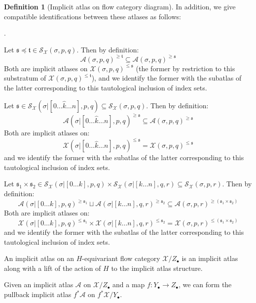 \documentclass[12pt]{article}
\theoremstyle{definition}
\newtheorem{definition}[theorem]{Definition}
\theoremstyle{remark}
\numberwithin{equation}{subsection}
\newcommand{\s}{\mathfrak s}
\newcommand{\ttt}{\mathfrak t}
\newcommand{\X}{\mathcal X}
\newcommand{\SSS}{\mathcal S}
\newcommand{\A}{\mathcal A}
\newcounter{rcounti}
\newenvironment{rlist}{\begin{list}{\roman{rcounti}.}{\usecounter{rcounti}
\setlength\itemsep{0pt}
\setlength\labelsep{4pt}
\setlength\labelwidth{16pt}
\setlength\leftmargin{32pt}
\setlength\listparindent{0pt}
\setlength\parsep{0pt}
\setlength\parskip{0pt}
\setlength\partopsep{0pt}
\setlength\rightmargin{0pt}
\setlength\topsep{0pt}
\setlength\itemindent{0pt}
}}{\end{list}}
\begin{document}
\begin{definition}[Implicit atlas on flow category diagram]
In addition, we give compatible identifications between these atlases as follows:
\begin{rlist}
\item\label{substratumC}Let $\s\preceq\ttt\in\SSS_\X(\sigma,p,q)$.  Then by definition:
\begin{equation*}%
\A(\sigma,p,q)^{\geq\ttt}\subseteq\A(\sigma,p,q)^{\geq\s}
\end{equation*}
Both are implicit atlases on $\X(\sigma,p,q)^{\leq\s}$ (the former by restriction to this substratum of $\X(\sigma,p,q)^{\leq\ttt}$), and we identify the former with the subatlas of the latter corresponding to this tautological inclusion of index sets.
\item\label{faceC}Let $\s\in\SSS_\X(\sigma|[0\ldots\hat k\ldots n],p,q)\subseteq\SSS_\X(\sigma,p,q)$.  Then by definition:
\begin{equation*}%
\A(\sigma|[0\ldots\hat k\ldots n],p,q)^{\geq\s}\subseteq\A(\sigma,p,q)^{\geq\s}
\end{equation*}
Both are implicit atlases on:
\begin{equation*}%
\X(\sigma|[0\ldots\hat k\ldots n],p,q)^{\leq\s}=\X(\sigma,p,q)^{\leq\s}
\end{equation*}
and we identify the former with the subatlas of the latter corresponding to this tautological inclusion of index sets.
\item\label{productC}Let $\s_1\times\s_2\in\SSS_\X(\sigma|[0\ldots k],p,q)\times\SSS_\X(\sigma|[k\ldots n],q,r)\subseteq\SSS_\X(\sigma,p,r)$.  Then by definition:
\begin{equation*}%
\A(\sigma|[0\ldots k],p,q)^{\geq\s_1}\sqcup\A(\sigma|[k\ldots n],q,r)^{\geq\s_2}\subseteq\A(\sigma,p,r)^{\geq(\s_1\times\s_2)}
\end{equation*}
Both are implicit atlases on:
\begin{equation*}%
\X(\sigma|[0\ldots k],p,q)^{\leq\s_1}\times\X(\sigma|[k\ldots n],q,r)^{\leq\s_2}=\X(\sigma,p,r)^{\leq(\s_1\times\s_2)}
\end{equation*}
and we identify the former with the subatlas of the latter corresponding to this tautological inclusion of index sets.
\end{rlist}
An implicit atlas on an $H$-equivariant flow category $\X/Z_\bullet$ is an implicit atlas along with a lift of the action of $H$ to the implicit atlas structure.

Given an implicit atlas $\A$ on $\X/Z_\bullet$ and a map $f:Y_\bullet\to Z_\bullet$, we can form the pullback implicit atlas $f^\ast\A$ on $f^\ast\X/Y_\bullet$.
\end{definition}
\end{document}
